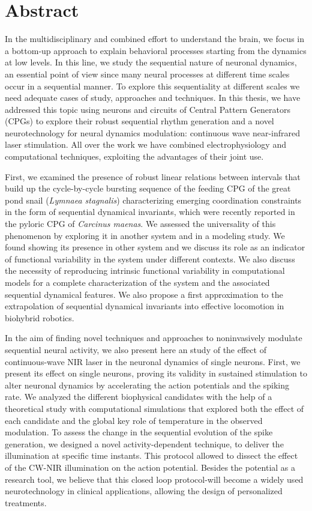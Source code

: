 \chapter*{Abstract}
In the multidisciplinary and combined effort to understand the brain, we focus in a bottom-up approach to explain behavioral processes starting from the dynamics at low levels. In this line, we study the sequential nature of neuronal dynamics, an essential point of view since many neural processes at different time scales occur in a sequential manner. To explore this sequentiality at different scales we need adequate cases of study, approaches and techniques. In this thesis, we have addressed this topic using neurons and circuits of Central Pattern Generators (CPGs) to explore their robust sequential rhythm generation and a novel neurotechnology for neural dynamics modulation: continuous wave near-infrared laser stimulation. All over the work we have combined electrophysiology and computational techniques, exploiting the advantages of their joint use. 

First, we examined the presence of robust linear relations between intervals that build up the cycle-by-cycle bursting sequence of the feeding CPG of the great pond snail (\textit{Lymnaea stagnalis}) characterizing emerging coordination constraints in the form of sequential dynamical invariants, which were recently reported in the pyloric CPG of \textit{Carcinus maenas}. We assessed the universality of this phenomenon by exploring it in another system and in a modeling study. We found showing its presence in other system and we discuss its role as an indicator of functional variability in the system under different contexts. We also discuss the necessity of reproducing intrinsic functional variability in computational models for a complete characterization of the system and the associated sequential dynamical features. We also propose a first approximation to the extrapolation of sequential dynamical invariants into effective locomotion in biohybrid robotics. 

In the aim of finding novel techniques and approaches to noninvasively modulate sequential neural activity, we also present here an study of the effect of continuous-wave NIR laser in the neuronal dynamics of single neurons. First, we present its effect on single neurons, proving its validity in sustained stimulation to alter neuronal dynamics by accelerating the action potentials and the spiking rate. We analyzed the different biophysical candidates with the help of a theoretical study with computational simulations that explored both the effect of each candidate and the global key role of temperature in the observed modulation. To assess the change in the sequential evolution of the spike generation,  we designed a novel activity-dependent technique, to deliver the illumination at specific time instants. This protocol allowed to dissect the effect of the CW-NIR illumination on the action potential. Besides the potential as a research tool, we believe that this closed loop protocol-will become a widely used neurotechnology in clinical applications, allowing the design of personalized treatments. 

